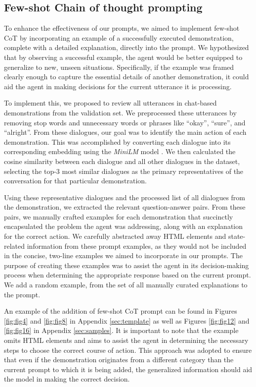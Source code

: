 \documentclass[11pt]{article}
\begin{document}
\subsection{Few-shot Chain of thought prompting}
To enhance the effectiveness of our prompts, we aimed to implement few-shot CoT by incorporating an example of a successfully executed demonstration, complete with a detailed explanation, directly into the prompt. We hypothesized that by observing a successful example, the agent would be better equipped to generalize to new, unseen situations. Specifically, if the example was framed clearly enough to capture the essential details of another demonstration, it could aid the agent in making decisions for the current utterance it is processing.

To implement this, we proposed to review all utterances in chat-based demonstrations from the validation set. We preprocessed these utterances by removing stop words and unnecessary words or phrases like “okay”, “sure”, and “alright”. From these dialogues, our goal was to identify the main action of each demonstration. This was accomplished by converting each dialogue into its corresponding embedding using the \textit{MiniLM} model \cite{minilm}. We then calculated the cosine similarity between each dialogue and all other dialogues in the dataset, selecting the top-3 most similar dialogues as the primary representatives of the conversation for that particular demonstration.

Using these representative dialogues and the processed list of all dialogues from the demonstration, we extracted the relevant question-answer pairs. From these pairs, we manually crafted examples for each demonstration that succinctly encapsulated the problem the agent was addressing, along with an explanation for the correct action. We carefully abstracted away HTML elements and state-related information from these prompt examples, as they would not be included in the concise, two-line examples we aimed to incorporate in our prompts. The purpose of creating these examples was to assist the agent in its decision-making process when determining the appropriate response based on the current prompt. We add a random example, from the set of all manually curated explanations to the prompt.

An example of the addition of few-shot CoT prompt can be found in Figures \ref{fig:fig4} and \ref{fig:fig8} in Appendix \ref{sec:template} as well as Figures \ref{fig:fig12} and \ref{fig:fig16} in Appendix \ref{sec:samples}. It is important to note that the example omits HTML elements and aims to assist the agent in determining the necessary steps to choose the correct course of action. This approach was adopted to ensure that even if the demonstration originates from a different category than the current prompt to which it is being added, the generalized information should aid the model in making the correct decision.
\end{document}
